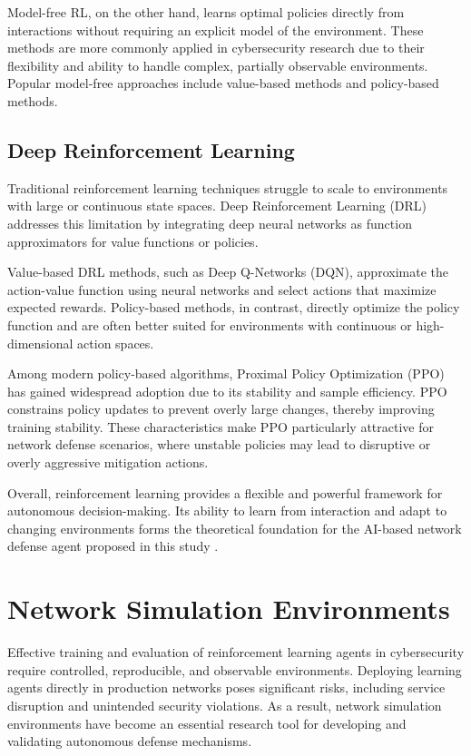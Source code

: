 \documentclass[12pt,a4paper]{report}
\begin{document}
Model-free RL, on the other hand, learns optimal policies directly from interactions without requiring an explicit model of the environment.
These methods are more commonly applied in cybersecurity research due to their flexibility and ability to handle complex, partially observable environments.
Popular model-free approaches include value-based methods and policy-based methods.

\subsection{Deep Reinforcement Learning}

Traditional reinforcement learning techniques struggle to scale to environments with large or continuous state spaces.
Deep Reinforcement Learning (DRL) addresses this limitation by integrating deep neural networks as function approximators for value functions or policies.

Value-based DRL methods, such as Deep Q-Networks (DQN), approximate the action-value function using neural networks and select actions that maximize expected rewards.
Policy-based methods, in contrast, directly optimize the policy function and are often better suited for environments with continuous or high-dimensional action spaces.

Among modern policy-based algorithms, Proximal Policy Optimization (PPO) has gained widespread adoption due to its stability and sample efficiency.
PPO constrains policy updates to prevent overly large changes, thereby improving training stability.
These characteristics make PPO particularly attractive for network defense scenarios, where unstable policies may lead to disruptive or overly aggressive mitigation actions.

Overall, reinforcement learning provides a flexible and powerful framework for autonomous decision-making.
Its ability to learn from interaction and adapt to changing environments forms the theoretical foundation for the AI-based network defense agent proposed in this study \cite{suttonBarto2018,schulmanPPO2017}.

\section{Network Simulation Environments}

Effective training and evaluation of reinforcement learning agents in cybersecurity require controlled, reproducible, and observable environments.
Deploying learning agents directly in production networks poses significant risks, including service disruption and unintended security violations.
As a result, network simulation environments have become an essential research tool for developing and validating autonomous defense mechanisms.
\end{document}
